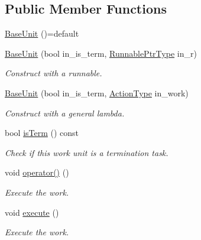 \subsection*{Public Member Functions}
\begin{DoxyCompactItemize}
\item 
\hyperlink{structvt_1_1sched_1_1_base_unit_a32cf291cd87b43dffa1f086d0ddb6c30}{Base\+Unit} ()=default
\item 
\hyperlink{structvt_1_1sched_1_1_base_unit_a4223dce0bcccbb989eb49106d2e37abe}{Base\+Unit} (bool in\+\_\+is\+\_\+term, \hyperlink{structvt_1_1sched_1_1_base_unit_ab635b72e57c53fa666d30bbfe5a0df17}{Runnable\+Ptr\+Type} in\+\_\+r)
\begin{DoxyCompactList}\small\item\em Construct with a runnable. \end{DoxyCompactList}\item 
\hyperlink{structvt_1_1sched_1_1_base_unit_a46072cff720f9dbcf7a1af4f9794ba90}{Base\+Unit} (bool in\+\_\+is\+\_\+term, \hyperlink{namespacevt_ae0a5a7b18cc99d7b732cb4d44f46b0f3}{Action\+Type} in\+\_\+work)
\begin{DoxyCompactList}\small\item\em Construct with a general lambda. \end{DoxyCompactList}\item 
bool \hyperlink{structvt_1_1sched_1_1_base_unit_a18e4bf669d499be8e9443011bf9c6b02}{is\+Term} () const
\begin{DoxyCompactList}\small\item\em Check if this work unit is a termination task. \end{DoxyCompactList}\item 
void \hyperlink{structvt_1_1sched_1_1_base_unit_accbb274436789b6b8ed99c3ee42a8114}{operator()} ()
\begin{DoxyCompactList}\small\item\em Execute the work. \end{DoxyCompactList}\item 
void \hyperlink{structvt_1_1sched_1_1_base_unit_aba3a1772f8a5efb922656dfba6434136}{execute} ()
\begin{DoxyCompactList}\small\item\em Execute the work. \end{DoxyCompactList}\end{DoxyCompactItemize}
